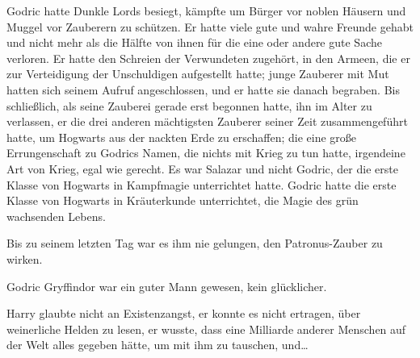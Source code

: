 Godric hatte Dunkle Lords besiegt, kämpfte um Bürger vor noblen Häusern und Muggel vor Zauberern zu schützen. Er hatte viele gute und wahre Freunde gehabt und nicht mehr als die Hälfte von ihnen für die eine oder andere gute Sache verloren. Er hatte den Schreien der Verwundeten zugehört, in den Armeen, die er zur Verteidigung der Unschuldigen aufgestellt hatte; junge Zauberer mit Mut hatten sich seinem Aufruf angeschlossen, und er hatte sie danach begraben. Bis schließlich, als seine Zauberei gerade erst begonnen hatte, ihn im Alter zu verlassen, er die drei anderen mächtigsten Zauberer seiner Zeit zusammengeführt hatte, um Hogwarts aus der nackten Erde zu erschaffen; die eine große Errungenschaft zu Godrics Namen, die nichts mit Krieg zu tun hatte, irgendeine Art von Krieg, egal wie gerecht. Es war Salazar und nicht Godric, der die erste Klasse von Hogwarts in Kampfmagie unterrichtet hatte. Godric hatte die erste Klasse von Hogwarts in Kräuterkunde unterrichtet, die Magie des grün wachsenden Lebens.

Bis zu seinem letzten Tag war es ihm nie gelungen, den Patronus-Zauber zu wirken.

Godric Gryffindor war ein guter Mann gewesen, kein glücklicher.

Harry glaubte nicht an Existenzangst, er konnte es nicht ertragen, über weinerliche Helden zu lesen, er wusste, dass eine Milliarde anderer Menschen auf der Welt alles gegeben hätte, um mit ihm zu tauschen, und…


